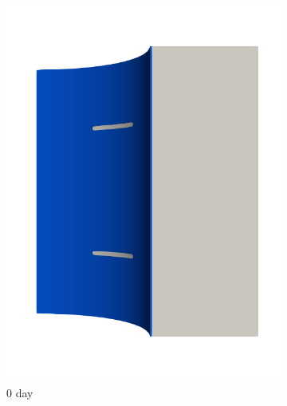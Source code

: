 \begin{figure}[!htb]
  \begin{subfigure}[b]{0.2\textwidth}
    \centering
    \includegraphics[width=\textwidth]{Chapter5/figures/spallation/seed_ep_1}
    \caption{0 day}
  \end{subfigure}
  \begin{subfigure}[b]{0.2\textwidth}
    \centering

\end{subfigure}
\end{figure}
